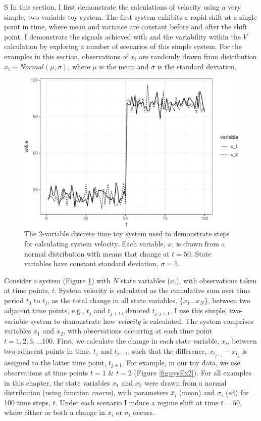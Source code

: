 \documentclass[12pt,twoside,openany]{reedthesis}
\begin{document}
S
In this section, I first demonstrate the calculations of velocity using a very simple, two-variable toy system. The first system exhibits a rapid shift at a single point in time, where mean and variance are constant before and after the shift point. I demonstrate the signals achieved with and the variability within the \(V\) calculation by exploring a number of scenarios of this simple system. For the examples in this section, observations of \(x_i\) are randomly drawn from distribution \(x_i\sim Normal(\mu, \sigma)\), where \(\mu\) is the mean and \(\sigma\) is the standard deviation.
\begin{figure}
\includegraphics[width=0.85\linewidth]{_myDissertation_files/figure-latex/sysEx-1} \caption{The 2-variable discrete time toy system used to demonstrate steps for calculating system velocity. Each variable, $x$, is drawn from a normal distribution with means that change at $t = 50$. State variables have constant standard deviation, $\sigma = 5$.}\label{fig:sysEx}
\end{figure}
Consider a system (Figure \ref{fig:sysEx}) with \(N\) state variables (\(x_i\)), with observations taken at time points, \(t\). System velocity is calculated as the cumulative sum over time period \(t_0\) to \(t_j\), as the total change in all state variables, \{\(x_1 ...x_N\)\}, between two adjacent time points, e.g., \(t_j\) and \(t_{j+1}\), denoted \(t_{j,j+1}\). I use this simple, two-variable system to demonstrate how \emph{velocity} is calculated. The system comprises variables \(x_1\) and \(x_2\), with observations occurring at each time point \(t = {1,2,3,...100}\). First, we calculate the change in each state variable, \(x_i\), between two adjacent points in time, \(t_j\) and \(t_{j+1}\), such that the difference, \(x_{t_{j+1}} - x_{t_j}\) is assigned to the latter time point, \(t_{j+1}\). For example, in our toy data, we use observations at time points \(t = 1\) \& \(t=2\) (Figure \ref{fig:sysEx2}). For all examples in this chapter, the state variables \(x_1\) and \(x_2\) were drawn from a normal distribution (using function \emph{rnorm}), with parameters \(\bar{x}_i\) (mean) and \(\sigma_i\) (sd) for 100 time steps, \(t\). Under each scenario I induce a regime shift at time \(t=50\), where either or both a change in \(\bar{x}_i\) or \(\sigma_i\) occurs.
\end{document}
